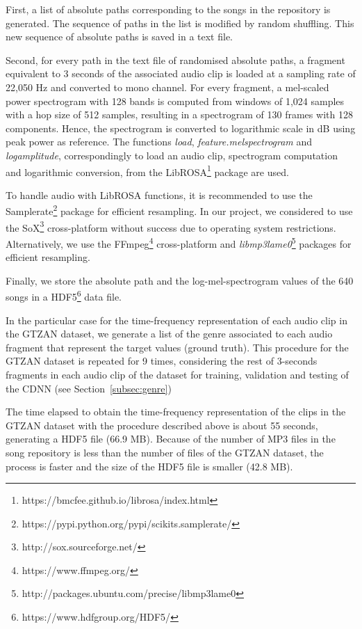 First, a list of absolute paths corresponding to the songs in the repository is generated. The sequence of paths in the list is modified by random shuffling. This new sequence of absolute paths is saved in a text file.

Second, for every path in the text file of randomised absolute paths, a fragment equivalent to 3 seconds of the associated audio clip is loaded at a sampling rate of 22,050 Hz and converted to mono channel. For every fragment, a mel-scaled power spectrogram with 128 bands is computed from windows of 1,024 samples with a hop size of 512 samples, resulting in a spectrogram of 130 frames with 128 components. Hence, the spectrogram is converted to logarithmic scale in dB using peak power as reference. The functions \textit{load}, \textit{feature.melspectrogram} and \textit{logamplitude}, correspondingly to load an audio clip, spectrogram computation and logarithmic conversion, from the LibROSA\footnote{https://bmcfee.github.io/librosa/index.html} package are used.

To handle audio with LibROSA functions, it is recommended to use the Samplerate\footnote{https://pypi.python.org/pypi/scikits.samplerate/} package for efficient resampling. In our project, we considered to use the SoX\footnote{http://sox.sourceforge.net/} cross-platform without success due to operating system restrictions. Alternatively, we use the FFmpeg\footnote{https://www.ffmpeg.org/} cross-platform and \textit{libmp3lame0}\footnote{http://packages.ubuntu.com/precise/libmp3lame0} packages for efficient resampling.

Finally, we store the absolute path and the log-mel-spectrogram values of the 640 songs in a HDF5\footnote{https://www.hdfgroup.org/HDF5/} data file.

In the particular case for the time-frequency representation of each audio clip in the GTZAN dataset, we generate a list of the genre associated to each audio fragment that represent the target values (ground truth). This procedure for the GTZAN dataset is repeated for 9 times, considering the rest of 3-seconds fragments in each audio clip of the dataset for training, validation and testing of the CDNN (see Section~\ref{subsec:genre})

The time elapsed to obtain the time-frequency representation of the clips in the GTZAN dataset with the procedure described above is about 55 seconds, generating a HDF5 file (66.9 MB). Because of the number of MP3 files in the song repository is less than the number of files of the GTZAN dataset, the process is faster and the size of the HDF5 file is smaller (42.8 MB).

